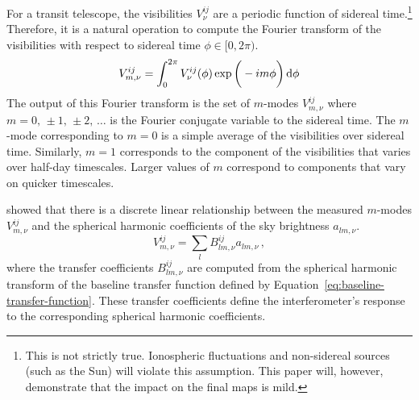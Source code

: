 \begin{bibunit}
For a transit telescope, the visibilities $V^{ij}_\nu$ are a periodic function of sidereal
time.\footnote{
    This is not strictly true. Ionospheric fluctuations and non-sidereal sources (such as the Sun)
    will violate this assumption. This paper will, however, demonstrate that the impact on the final
    maps is mild.
}
Therefore, it is a natural operation to compute the Fourier transform of the visibilities with
respect to sidereal time $\phi\in[0,2\pi)$.
\begin{equation}
    V^{ij}_{m,\nu} = \int_0^{2\pi} V^{ij}_\nu(\phi)\exp\bigg(-im\phi\bigg)\,{\textrm d}\phi
\end{equation}
The output of this Fourier transform is the set of $m$-modes $V^{ij}_{m,\nu}$ where
$m=0,\,\pm1,\,\pm2,\,\ldots$ is the Fourier conjugate variable to the sidereal time. The $m$-mode
corresponding to $m=0$ is a simple average of the visibilities over sidereal time. Similarly, $m=1$
corresponds to the component of the visibilities that varies over half-day timescales. Larger values
of $m$ correspond to components that vary on quicker timescales.

\citet{2014ApJ...781...57S, 2015PhRvD..91h3514S} showed that there is a discrete linear relationship
between the measured $m$-modes $V^{ij}_{m,\nu}$ and the spherical harmonic coefficients of the sky
brightness $a_{lm,\nu}$.
\begin{equation}\label{eq:m-mode-sum-equation}
    V^{ij}_{m,\nu} = \sum_l B^{ij}_{lm,\nu} a_{lm,\nu}\,,
\end{equation}
where the transfer coefficients $B^{ij}_{lm,\nu}$ are computed from the spherical harmonic transform
of the baseline transfer function defined by Equation~\ref{eq:baseline-transfer-function}. These
transfer coefficients define the interferometer's response to the corresponding spherical harmonic
coefficients.


\end{bibunit}
